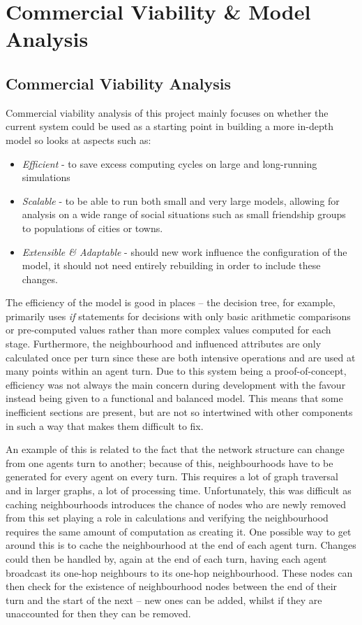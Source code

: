 \documentclass[]{report}
\begin{document}
\section{Commercial Viability \& Model Analysis}
\subsection{Commercial Viability Analysis}

Commercial viability analysis of this project mainly focuses on whether the current system could be used as a starting point in building a more in-depth model so looks at aspects such as:
\begin{itemize}
\item \emph{Efficient} - to save excess computing cycles on large and long-running simulations
\item \emph{Scalable} - to be able to run both small and very large models, allowing for analysis on a wide range of social situations such as small friendship groups to populations of cities or towns.
\item \emph{Extensible \& Adaptable} - should new work influence the configuration of the model, it should not need entirely rebuilding in order to include these changes.
\end{itemize}

The efficiency of the model is good in places – the decision tree, for example, primarily uses \emph{if} statements for decisions with only basic arithmetic comparisons or pre-computed values rather than more complex values computed for each stage. Furthermore, the neighbourhood and influenced attributes are only calculated once per turn since these are both intensive operations and are used at many points within an agent turn.  Due to this system being a proof-of-concept, efficiency was not always the main concern during development with the favour instead being given to a functional and balanced model. This means that some inefficient sections are present, but are not so intertwined with other components in such a way that makes them difficult to fix.   

An example of this is related to the fact that the network structure can change from one agents turn to another; because of this, neighbourhoods have to be generated for every agent on every turn. This requires a lot of graph traversal and in larger graphs, a lot of processing time. Unfortunately, this was difficult as caching neighbourhoods introduces the chance of nodes who are newly removed from this set playing a role in calculations and verifying the neighbourhood requires the same amount of computation as creating it. One possible way to get around this is to cache the neighbourhood at the end of each agent turn. Changes could then be handled by, again at the end of each turn, having each agent broadcast its one-hop neighbours to its one-hop neighbourhood. These nodes can then check for the existence of neighbourhood nodes between the end of their turn and the start of the next – new ones can be added, whilst if they are unaccounted for then they can be removed.
\end{document}
